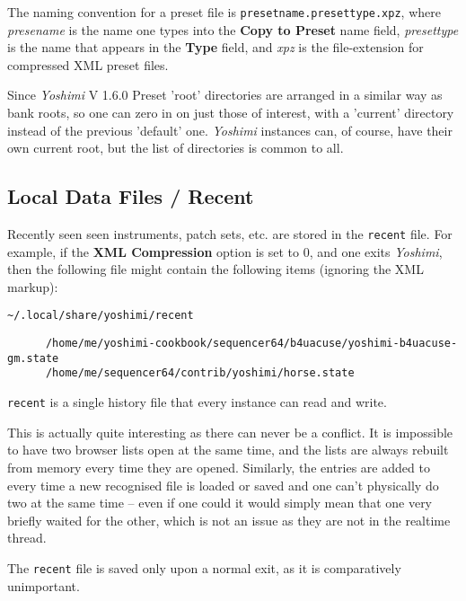    The naming convention for a preset file is
   \texttt{presetname.presettype.xpz}, where
   \textsl{presename} is the name one types into the \textbf{Copy to Preset}
   name field, \textsl{presettype} is the name that appears in the
   \textbf{Type} field, and \textsl{xpz} is the file-extension for compressed
   XML preset files.

   Since \textsl{Yoshimi} V 1.6.0 Preset 'root' directories are arranged in a
   similar way as bank roots, so one can zero in on just those of interest,
   with a 'current' directory instead of the previous 'default' one.
   \textsl{Yoshimi} instances can, of course, have their own current root, but
   the list of directories is common to all.

\subsection{Local Data Files / Recent}
\label{subsec:local_data_recent}

   Recently seen seen instruments, patch sets, etc. are stored in the
   \texttt{recent} file. For example, if the \textbf{XML Compression} option
   is set to 0, and one exits \textsl{Yoshimi}, then the following file might
   contain the following items (ignoring the XML markup):

   \texttt{\textasciitilde/.local/share/yoshimi/recent}

   \begin{verbatim}
      /home/me/yoshimi-cookbook/sequencer64/b4uacuse/yoshimi-b4uacuse-gm.state
      /home/me/sequencer64/contrib/yoshimi/horse.state
   \end{verbatim}

   \texttt{recent} is a single history file that every instance can read and
   write.

   This is actually quite interesting as there can never be a conflict.  It is
   impossible to have two browser lists open at the same time, and the lists are
   always rebuilt from memory every time they are opened. Similarly, the entries
   are added to every time a new recognised file is loaded or saved and one
   can't physically do two at the same time -- even if one could it would simply
   mean that one very briefly waited for the other, which is not an issue as
   they are not in the realtime thread.

   The \texttt{recent} file is saved only upon a normal exit, as it is
   comparatively unimportant.

